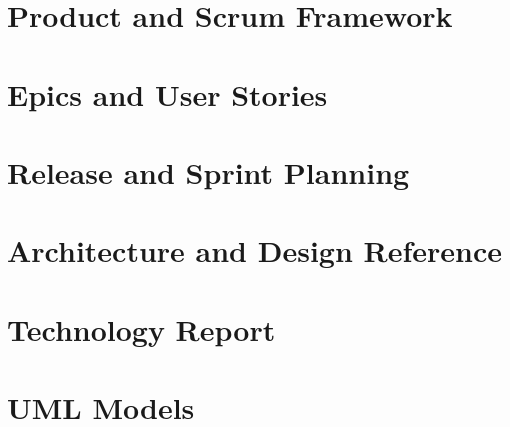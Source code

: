 \documentclass[11pt,a4paper]{report}
\begin{document}


\tableofcontents
\clearpage
\listoffigures
\clearpage
\listoftables
\clearpage

\part{Product and Scrum Framework}




\part{Epics and User Stories}













\part{Release and Sprint Planning}




\part{Architecture and Design Reference}










\part{Technology Report}




\part{UML Models}





\end{document}
